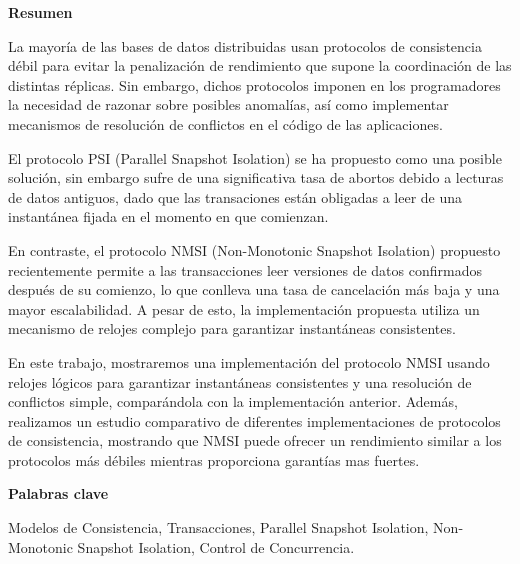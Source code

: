 \newpage

\begin{center}
{\bf \Huge Resumen}
\end{center}

\vspace{1cm}

La mayoría de las bases de datos distribuidas usan protocolos de consistencia débil
para evitar la penalización de rendimiento que supone la coordinación de las distintas
réplicas. Sin embargo, dichos protocolos imponen en los programadores la necesidad de
razonar sobre posibles anomalías, así como implementar mecanismos de resolución de
conflictos en el código de las aplicaciones.

El protocolo PSI (Parallel Snapshot Isolation) se ha propuesto como una posible solución,
sin embargo sufre de una significativa tasa de abortos debido a lecturas de datos antiguos,
dado que las transaciones están obligadas a leer de una instantánea fijada en el momento
en que comienzan.

En contraste, el protocolo NMSI (Non-Monotonic Snapshot Isolation) propuesto recientemente
permite a las transacciones leer versiones de datos confirmados después de su comienzo,
lo que conlleva una tasa de cancelación más baja y una mayor escalabilidad. A pesar de esto,
la implementación propuesta utiliza un mecanismo de relojes complejo para garantizar instantáneas
consistentes.

En este trabajo, mostraremos una implementación del protocolo NMSI usando relojes lógicos
para garantizar instantáneas consistentes y una resolución de conflictos simple, comparándola
con la implementación anterior. Además, realizamos un estudio comparativo de diferentes
implementaciones de protocolos de consistencia, mostrando que NMSI puede ofrecer un rendimiento
similar a los protocolos más débiles mientras proporciona garantías mas fuertes.

\vspace{0.8cm} %

\begin{center}
{\bf \Large Palabras clave}
\end{center}

\vspace{0.5cm}

Modelos de Consistencia, Transacciones, Parallel Snapshot Isolation, Non-Monotonic Snapshot Isolation, Control de Concurrencia.
